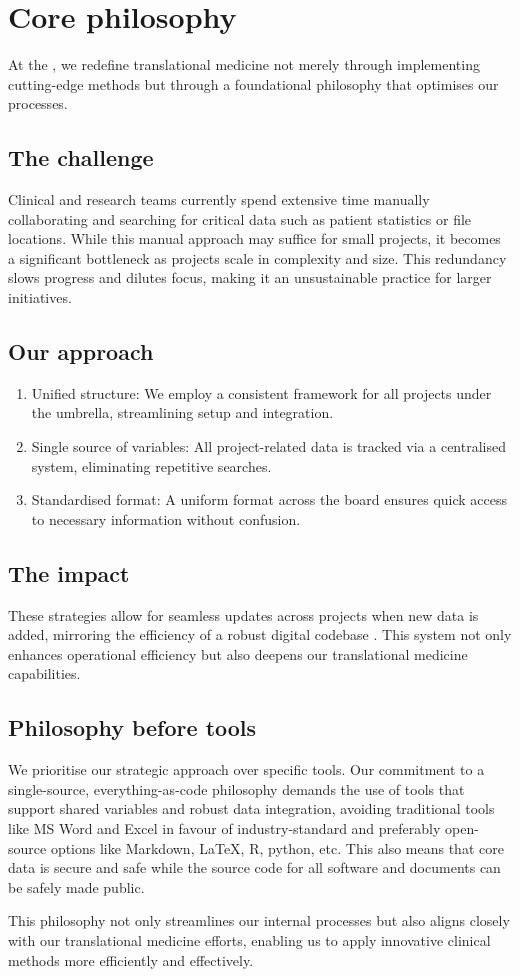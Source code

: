\section{Core philosophy}
At the \pmu, we redefine translational medicine not merely through implementing cutting-edge methods but through a foundational philosophy that optimises our processes.

\subsection*{The challenge}
Clinical and research teams currently spend extensive time manually collaborating and searching for critical data such as patient statistics or file locations. 
While this manual approach may suffice for small projects, it becomes a significant bottleneck as projects scale in complexity and size. 
This redundancy slows progress and dilutes focus, making it an unsustainable practice for larger initiatives.

\subsection*{Our approach}
\begin{enumerate}
\item  Unified structure: We employ a consistent framework for all projects under the \pmu umbrella, streamlining setup and integration.
\item Single source of variables: All project-related data is tracked via a centralised system, eliminating repetitive searches.
\item Standardised format: A uniform format across the board ensures quick access to necessary information without confusion.
\end{enumerate}

\subsection*{The impact}
These strategies allow for seamless updates across projects when new data is added, mirroring the efficiency of a robust digital codebase 
\citep{potvin_levenberg_google_ACM}. 
This system not only enhances operational efficiency but also deepens our translational medicine capabilities.

\subsection*{Philosophy before tools}
We prioritise our strategic approach over specific tools. 
Our commitment to a single-source, everything-as-code philosophy demands the use of tools that support shared variables and robust data integration, avoiding traditional tools like MS Word and Excel in favour of industry-standard and preferably open-source options like Markdown, LaTeX, R, python, etc.
This also means that core data is secure and safe while the source code for all software and documents can be safely made public.

This philosophy not only streamlines our internal processes but also aligns closely with our translational medicine efforts, enabling us to apply innovative clinical methods more efficiently and effectively.
